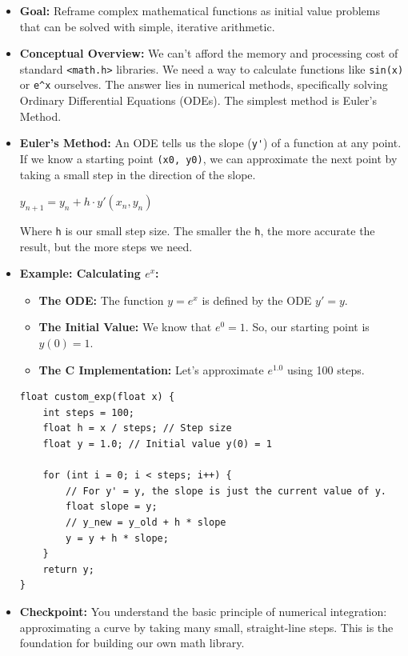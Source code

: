 \documentclass[11pt,a4paper]{article}
\begin{document}
\begin{itemize}
    \item \textbf{Goal:} Reframe complex mathematical functions as initial value problems that can be solved with simple, iterative arithmetic.
    \item \textbf{Conceptual Overview:} We can't afford the memory and processing cost of standard \verb|<math.h>| libraries. We need a way to calculate functions like \verb|sin(x)| or \verb|e^x| ourselves. The answer lies in numerical methods, specifically solving Ordinary Differential Equations (ODEs). The simplest method is Euler's Method.
    \item \textbf{Euler's Method:} An ODE tells us the slope (\verb|y'|) of a function at any point. If we know a starting point \verb|(x0, y0)|, we can approximate the next point by taking a small step in the direction of the slope.
    \begin{center}
    $y_{n+1} = y_n + h \cdot y'(x_n, y_n)$
    \end{center}
    Where \verb|h| is our small step size. The smaller the \verb|h|, the more accurate the result, but the more steps we need.
    \item \textbf{Example: Calculating $e^x$:}
    \begin{itemize}
        \item \textbf{The ODE:} The function $y = e^x$ is defined by the ODE $y' = y$.
        \item \textbf{The Initial Value:} We know that $e^0 = 1$. So, our starting point is $y(0) = 1$.
        \item \textbf{The C Implementation:} Let's approximate $e^{1.0}$ using 100 steps.
    \end{itemize}
\begin{lstlisting}[caption={Code for Module 7.3: Euler's Method for $e^x$}]
float custom_exp(float x) {
    int steps = 100;
    float h = x / steps; // Step size
    float y = 1.0; // Initial value y(0) = 1

    for (int i = 0; i < steps; i++) {
        // For y' = y, the slope is just the current value of y.
        float slope = y;
        // y_new = y_old + h * slope
        y = y + h * slope;
    }
    return y;
}
\end{lstlisting}
    \item \textbf{Checkpoint:} You understand the basic principle of numerical integration: approximating a curve by taking many small, straight-line steps. This is the foundation for building our own math library.
\end{itemize}
\end{document}
